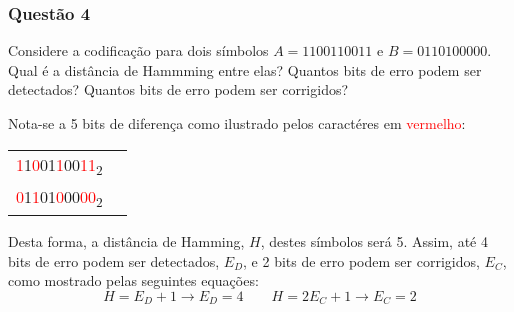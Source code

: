 \documentclass[es572.tex]{subfiles}
\begin{document}
        \newpage\subsubsection{Questão 4}
            \begin{exercise}
                Considere a codificação para dois símbolos $A = 1100110011$ e $B = 0110100000$. Qual é a distância de Hammming entre elas? Quantos bits de erro podem ser detectados? Quantos bits de erro podem ser corrigidos?
            \end{exercise}
            \begin{resolution}
                Nota-se a 5 bits de diferença como ilustrado pelos caractéres em \textcolor{red}{vermelho}:
                    \begin{table}[H]
                        \centering
                        \begin{tabular}[]{cc}\hline
                            \textcolor{red}{1}1\textcolor{red}{0}01\textcolor{red}{1}00\textcolor{red}{11}\textsubscript{2}\\
                            \textcolor{red}{0}1\textcolor{red}{1}01\textcolor{red}{0}00\textcolor{red}{00}\textsubscript{2}\\\hline
                        \end{tabular}
                    \end{table}\noindent
                Desta forma, a distância de Hamming, $H$, destes símbolos será 5. Assim, até 4 bits de erro podem ser detectados, $E_{D}$, e 2 bits de erro podem ser corrigidos, $E_{C}$, como mostrado pelas seguintes equações:
                    \begin{equation*}
                        H =  E_{D} + 1 \rightarrow E_{D} = 4
                        \qquad
                        H = 2E_{C} + 1 \rightarrow E_{C} = 2
                    \end{equation*}
            \end{resolution}
\end{document}
